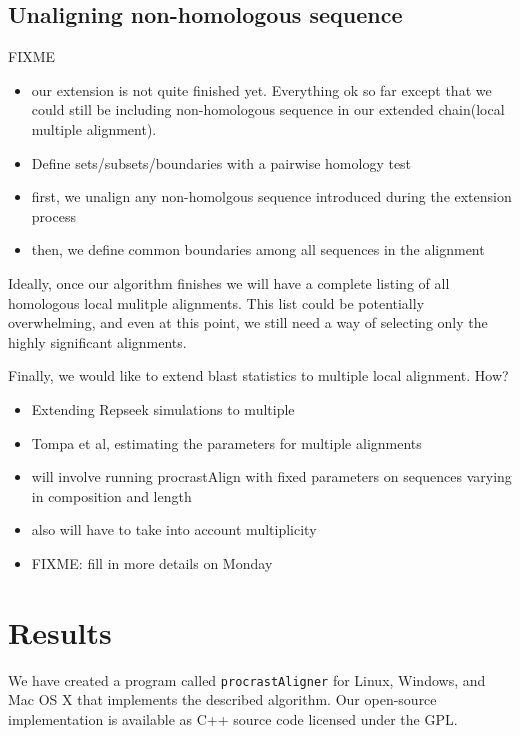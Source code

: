 \documentclass{llncs}
\begin{document}
\subsection{Unaligning non-homologous sequence}
FIXME
\begin{itemize}
\item our extension is not quite finished yet. Everything ok so far except that we could
still be including non-homologous sequence in our extended chain(local multiple alignment).
\item Define sets/subsets/boundaries with a pairwise homology test
\item first, we unalign any non-homolgous sequence introduced during the extension process
\item then, we define common boundaries among all sequences in the alignment
\end{itemize}



Ideally, once our algorithm finishes we will have a complete listing of all homologous local mulitple alignments. This list could be potentially overwhelming, and even at this point, we still need a way of selecting only the highly significant alignments. 

Finally, we would like to extend blast statistics to multiple local alignment. How?
\begin{itemize}
\item Extending Repseek simulations to multiple
\item Tompa et al, estimating the parameters for multiple alignments
\item will involve running procrastAlign with fixed parameters on sequences varying in composition and length
\item also will have to take into account multiplicity
\item FIXME: fill in more details on Monday
\end{itemize}

\section{Results}
We have created a program called \texttt{procrastAligner} for Linux,
Windows, and Mac OS X that implements the described algorithm. Our
open-source implementation is available as C++ source code licensed
under the GPL.
\end{document}
